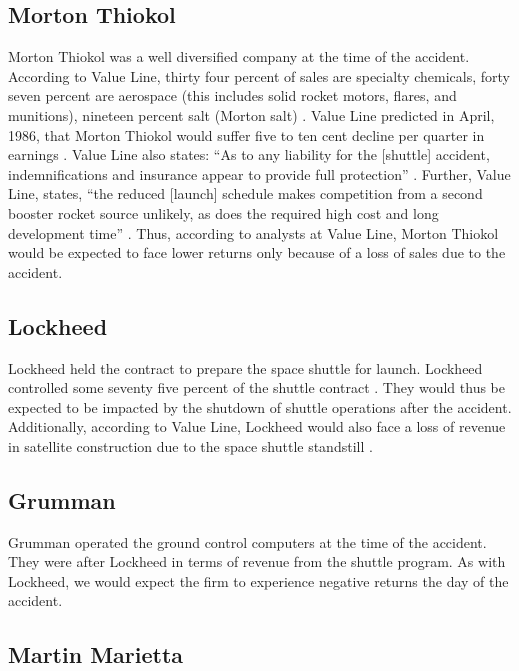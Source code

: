 \subsection{Morton Thiokol}

Morton Thiokol was a well diversified company at the time of the accident. According to Value Line, thirty four percent of sales are specialty chemicals, forty seven percent are aerospace (this includes solid rocket motors, flares, and munitions), nineteen percent salt (Morton salt) \cite{vlmti486}. Value Line predicted in April, 1986, that Morton Thiokol would suffer five to ten cent decline per quarter in earnings \cite{vlmti486}. Value Line also states: ``As to any liability for the [shuttle] accident, indemnifications and insurance appear to provide full protection'' \cite{vlmti486}. Further, Value Line, states, ``the reduced [launch] schedule makes competition from a second booster rocket source unlikely, as does the required high cost and long development time'' \cite{vlmti486}. Thus, according to analysts at Value Line, Morton Thiokol would be expected to face lower returns only because of a loss of sales due to the accident.

\subsection{Lockheed}

Lockheed held the contract to prepare the space shuttle for launch. Lockheed controlled some seventy five percent of the shuttle contract \cite{wsjfirms}. They would thus be expected to be impacted by the shutdown of shuttle operations after the accident. Additionally, according to Value Line, Lockheed would also face a loss of revenue in satellite construction due to the space shuttle standstill \cite{vllock786}.

\subsection{Grumman}

Grumman operated the ground control computers at the time of the accident. They were after Lockheed in terms of revenue from the shuttle program. As with Lockheed, we would expect the firm to experience negative returns the day of the accident.

\subsection{Martin Marietta}

